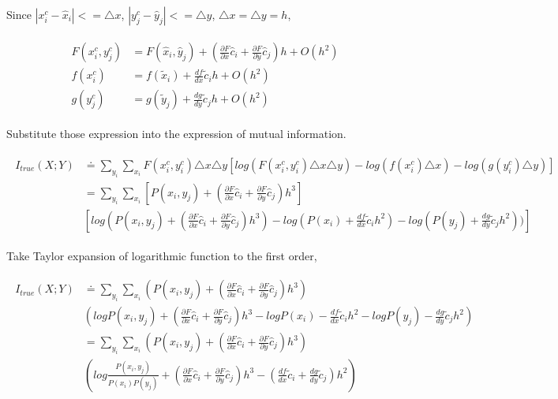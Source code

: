 \documentclass[paper=a4, fontsize=11pt]{article} %
\numberwithin{equation}{section} %
\numberwithin{figure}{section} %
\numberwithin{table}{section} %
\begin{document}
Since $|x_i^c - \hat{x}_i| <= \triangle x$, $|y_j^c - \hat{y}_j| <= \triangle y$, $\triangle x = \triangle y = h$,

\begin{align}
	\begin{split}
		F(x_i^c, y_j^c) &= F(\hat{x}_i, \hat{y}_j) + (\frac{\partial F}{\partial x}\hat{c}_i + \frac{\partial F}{\partial y}\hat{c}_j)h + O(h^2)\\
		f(x_i^c) &= f(\tilde{x}_i) + \frac{df}{dx}\tilde{c}_ih + O(h^2)\\
		g(y_j^c) &= g(\tilde{y}_j) + \frac{dg}{dy}\tilde{c}_jh + O(h^2)
	\end{split}
\end{align}

Substitute those expression into the expression of mutual information.

\begin{align}
\begin{split}
	I_{true}(X;Y) &\doteq\sum_{y_i}\sum_{x_i} F(x_i^c,y_i^c)\triangle x \triangle y[log(F(x_i^c,y_i^c)\triangle x\triangle y)-log(f(x_i^c)\triangle x) - log(g(y_i^c)\triangle y)]\\
	&= \sum_{y_i}\sum_{x_i} [P(x_i, y_j) + (\frac{\partial F}{\partial x}\hat{c}_i + \frac{\partial F}{\partial y}\hat{c}_j)h^3] \\
	&[log(P(x_i, y_j) + (\frac{\partial F}{\partial x}\hat{c}_i + \frac{\partial F}{\partial y}\hat{c}_j)h^3) - log(P(x_i) + \frac{df}{dx}\tilde{c}_ih^2) - log(P(y_j) + \frac{dg}{dy}\tilde{c}_jh^2))]
\end{split}
\end{align}

Take Taylor expansion of logarithmic function to the first order,

\begin{align}
\begin{split}
	I_{true}(X;Y)	&\doteq \sum_{y_i}\sum_{x_i} (P(x_i, y_j) + (\frac{\partial F}{\partial x}\hat{c}_i + \frac{\partial F}{\partial y}\hat{c}_j)h^3) \\
	&(logP(x_i, y_j) + (\frac{\partial F}{\partial x}\hat{c}_i + \frac{\partial F}{\partial y}\hat{c}_j)h^3 - logP(x_i) - \frac{df}{dx}\tilde{c}_ih^2 - logP(y_j) - \frac{dg}{dy}\tilde{c}_jh^2) \\
	&= \sum_{y_i}\sum_{x_i} (P(x_i, y_j) + (\frac{\partial F}{\partial x}\hat{c}_i + \frac{\partial F}{\partial y}\hat{c}_j)h^3) \\
	&(log\frac{P(x_i, y_j)}{P(x_i)P(y_j)} + (\frac{\partial F}{\partial x}\hat{c}_i + \frac{\partial F}{\partial y}\hat{c}_j)h^3 - (\frac{df}{dx}\tilde{c}_i + \frac{dg}{dy}\tilde{c}_j)h^2)
\end{split}
\end{align}
\end{document}
